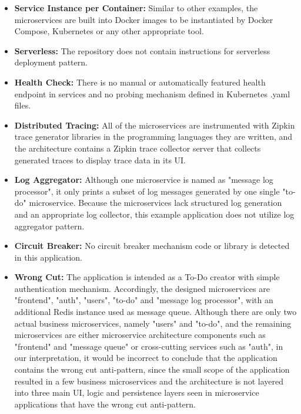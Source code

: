 \documentclass{Configuration_Files/PoliMi3i_thesis}
\begin{document}
\begin{itemize}
    \item \textbf{Service Instance per Container:} Similar to other examples, the microservices are built into Docker images to be instantiated by Docker Compose, Kubernetes or any other appropriate tool.
    
    \item \textbf{Serverless:} The repository does not contain instructions for serverless deployment pattern.
    
    \item \textbf{Health Check:} There is no manual or automatically featured health endpoint in services and no probing mechanism defined in Kubernetes .yaml files.
    
    \item \textbf{Distributed Tracing:} All of the microservices are instrumented with Zipkin trace generator libraries in the programming languages they are written, and the architecture contains a Zipkin trace collector server that collects generated traces to display trace data in its UI.
    
    \item \textbf{Log Aggregator:} Although one microservice is named as "message log processor", it only prints a subset of log messages generated by one single "to-do" microservice.
    Because the microservices lack structured log generation and an appropriate log collector, this example application does not utilize log aggregator pattern.
    
    \item \textbf{Circuit Breaker:} No circuit breaker mechanism code or library is detected in this application.
    
    \item \textbf{Wrong Cut:} The application is intended as a To-Do creator with simple authentication mechanism.
    Accordingly, the designed microservices are "frontend", "auth", "users", "to-do" and "message log processor", with an additional Redis instance used as message queue.
    Although there are only two actual business microservices, namely "users" and "to-do", and the remaining microservices are either microservice architecture components such as "frontend" and "message queue" or cross-cutting services such as "auth", in our interpretation, it would be incorrect to conclude that the application contains the wrong cut anti-pattern, since the small scope of the application resulted in a few business microservices and the architecture is not layered into three main UI, logic and persistence layers seen in microservice applications that have the wrong cut anti-pattern.
    

\end{itemize}
\end{document}
